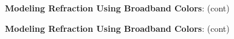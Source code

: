 \documentclass[DM,toc]{lsstdoc}
\begin{document}
\begin{figure}
    \ContinuedFloat
    \centering
    \caption[]{\textbf{Modeling Refraction Using Broadband Colors}: (cont)}
    \label{rmodel2}
\end{figure}
\begin{figure}
    \ContinuedFloat
    \centering
    \caption[]{\textbf{Modeling Refraction Using Broadband Colors}: (cont)}
    \label{rmodel2}
\end{figure}
\clearpage
\end{document}
